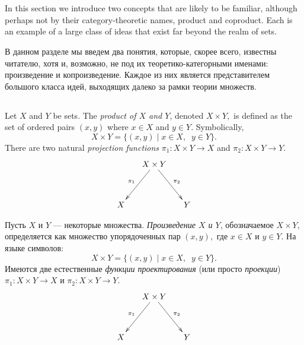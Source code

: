 \documentclass[../main/CT4S-EN-RU]{subfiles}
\begin{document}
\section{}\label{sec:prods and coprods in set}

\begin{blockENG}
In this section we introduce two concepts that are likely to be familiar, although perhaps not by their category-theoretic names, product and coproduct. Each is an example of a large class of ideas that exist far beyond the realm of sets.
\end{blockENG}

\begin{blockRUS}
В данном разделе мы введем два понятия, которые, скорее всего, известны читателю, хотя и, возможно, не под их теоретико-категорными именами: произведение и копроизведение. Каждое из них является представителем большого класса идей, выходящих далеко за рамки теории множеств. 
\end{blockRUS}


\subsection{}\label{sec:products}

\begin{definitionENG}
Let $X$ and $Y$ be sets. The {\em product of $X$ and $Y$}, denoted $X\times Y,$ is defined as the set of ordered pairs $(x,y)$ where $x\in X$ and $y\in Y.$ Symbolically, $$X\times Y=\{(x,y){\;|\;}x\in X,\;\; y\in Y\}.$$ There are two natural {\em projection functions} $\pi_1\colon X\times Y{→} X$ and $\pi_2\colon X\times Y{→} Y.$
$$\xymatrix@=15pt{&X\times Y\ar[ddr]^{\pi_2}\ar[ddl]_{\pi_1}\\\\X&&Y}$$
\end{definitionENG}

\begin{definitionRUS}
Пусть $X$ и $Y$ — некоторые множества. {\em Произведение $X$ и $Y$}, обозначаемое $X\times Y,$ определяется как множество упорядоченных пар $(x,y),$ где $x\in X$ и $y\in Y.$ На языке символов: $$X\times Y=\{(x,y){\;|\;}x\in X,\;\; y\in Y\}.$$ Имеются две естественные {\em функции проектирования} (или просто {\em проекции}) $\pi_1\colon X\times Y{→} X$ и $\pi_2\colon X\times Y{→} Y.$
$$\xymatrix@=15pt{&X\times Y\ar[ddr]^{\pi_2}\ar[ddl]_{\pi_1}\\\\X&&Y}$$
\end{definitionRUS}
\end{document}
